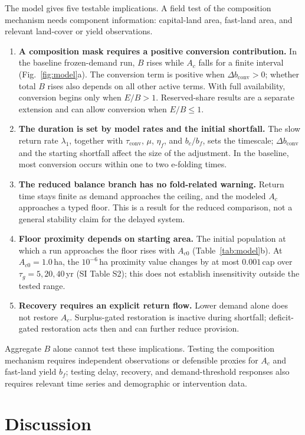 \documentclass[preprint,12pt,authoryear]{elsarticle}
\newcommand{\dconv}{\Delta b_{\mathrm{conv}}}
\newcommand{\tconv}{\tau_{\mathrm{conv}}}
\begin{document}
The model gives five testable implications. A field test of the composition mechanism needs component information: capital-land area, fast-land area, and relevant land-cover or yield observations.
\begin{enumerate}[label=P\arabic*.,leftmargin=2.2em]
\item \textbf{A composition mask requires a positive conversion contribution.} In the baseline frozen-demand run, $B$ rises while $A_c$ falls for a finite interval (Fig.~\ref{fig:model}a). The conversion term is positive when $\dconv>0$; whether total $B$ rises also depends on all other active terms. With full availability, conversion begins only when $E/B>1$. Reserved-share results are a separate extension and can allow conversion when $E/B\le1$.
\item \textbf{The duration is set by model rates and the initial shortfall.} The slow return rate $\lambda_1$, together with $\tconv$, $\mu$, $\eta_f$, and $b_c/b_f$, sets the timescale; $\dconv$ and the starting shortfall affect the size of the adjustment. In the baseline, most conversion occurs within one to two e-folding times.
\item \textbf{The reduced balance branch has no fold-related warning.} Return time stays finite as demand approaches the ceiling, and the modeled $A_c$ approaches a typed floor. This is a result for the reduced comparison, not a general stability claim for the delayed system.
\item \textbf{Floor proximity depends on starting area.} The initial population at which a run approaches the floor rises with $A_{c0}$ (Table~\ref{tab:model}b). At $A_{c0}=1.0$\,ha, the $10^{-6}$\,ha proximity value changes by at most $0.001$\,cap over $\tau_g=5,20,40$\,yr (SI Table S2); this does not establish insensitivity outside the tested range.
\item \textbf{Recovery requires an explicit return flow.} Lower demand alone does not restore $A_c$. Surplus-gated restoration is inactive during shortfall; deficit-gated restoration acts then and can further reduce provision.
\end{enumerate}
Aggregate $B$ alone cannot test these implications. Testing the composition mechanism requires independent observations or defensible proxies for $A_c$ and fast-land yield $b_f$; testing delay, recovery, and demand-threshold responses also requires relevant time series and demographic or intervention data.

\clearpage
\section{Discussion}\label{sec:discussion}
\end{document}
